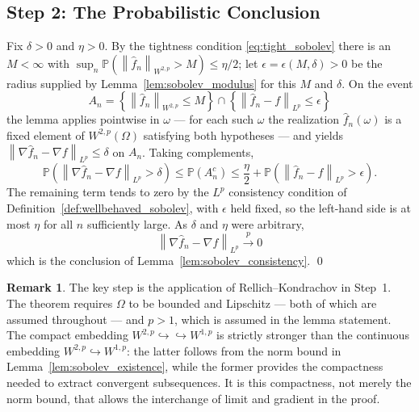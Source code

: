 \documentclass[12pt,a4paper]{article}
\numberwithin{equation}{section}
\theoremstyle{plain}
\theoremstyle{definition}
\newtheorem{remark}{Remark}
\newcommand{\norm}[1]{\left\| #1 \right\|}
\newcommand{\Wtwop}{W^{2,p}(\Omega)}
\newcommand{\fn}{\hat{f}_n}
\newcommand{\xrightarrowp}{\xrightarrow{p}}
\newcommand{\Prob}{\mathbb{P}}
\begin{document}
	\subsection{Step 2: The Probabilistic Conclusion}

	Fix $\delta > 0$ and $\eta > 0$. By the tightness condition
	\eqref{eq:tight_sobolev} there is an $M < \infty$ with
	$\sup_n \Prob(\norm{\fn}_{W^{2,p}} > M) \leq \eta/2$; let
	$\epsilon = \epsilon(M,\delta) > 0$ be the radius supplied by
	Lemma~\ref{lem:sobolev_modulus} for this $M$ and $\delta$. On the event
	\begin{equation}
		A_n = \left\{\norm{\fn}_{W^{2,p}} \leq M\right\}
		\cap \left\{\norm{\fn - f}_{L^p} \leq \epsilon\right\}
	\end{equation}
	the lemma applies pointwise in $\omega$ --- for each such $\omega$ the
	realization $\fn(\omega)$ is a fixed element of $\Wtwop$ satisfying both
	hypotheses --- and yields
	$\norm{\nabla \fn - \nabla f}_{L^p} \leq \delta$ on $A_n$. Taking
	complements,
	\begin{equation}
		\Prob\!\left(\norm{\nabla \fn - \nabla f}_{L^p} > \delta\right)
		\leq \Prob(A_n^c)
		\leq \frac{\eta}{2}
		+ \Prob\!\left(\norm{\fn - f}_{L^p} > \epsilon\right) .
	\end{equation}
	The remaining term tends to zero by the $L^p$ consistency condition of
	Definition~\ref{def:wellbehaved_sobolev}, with $\epsilon$ held fixed, so the
	left-hand side is at most $\eta$ for all $n$ sufficiently large. As $\delta$
	and $\eta$ were arbitrary,
	\begin{equation}
		\norm{\nabla \fn - \nabla f}_{L^p} \xrightarrowp 0
	\end{equation}
	which is the conclusion of Lemma~\ref{lem:sobolev_consistency}. \qed
	
	\begin{remark}
		The key step is the application of Rellich--Kondrachov in Step~1. The
		theorem requires $\Omega$ to be bounded and Lipschitz --- both of which are
		assumed throughout --- and $p > 1$, which is assumed in the lemma statement.
		The compact embedding $W^{2,p} \hookrightarrow\hookrightarrow W^{1,p}$ is
		strictly stronger than the continuous embedding $W^{2,p} \hookrightarrow
		W^{1,p}$: the latter follows from the norm bound in
		Lemma~\ref{lem:sobolev_existence}, while the former provides the
		compactness needed to extract convergent subsequences. It is this
		compactness, not merely the norm bound, that allows the interchange of
		limit and gradient in the proof.
	\end{remark}
	
\end{document}
